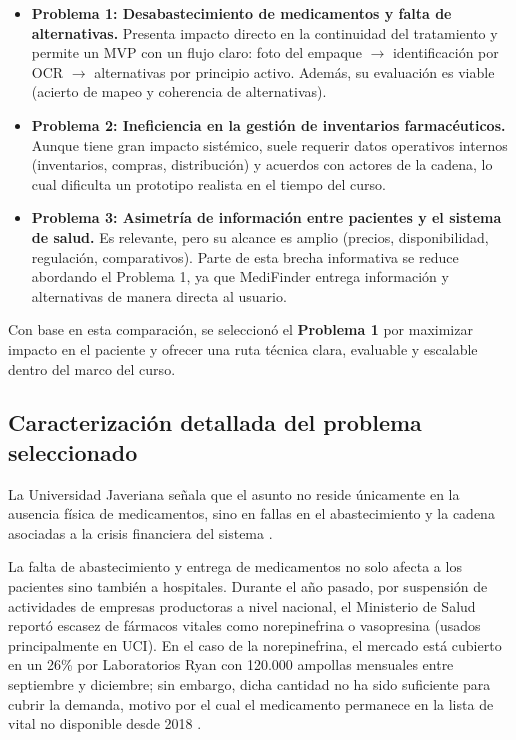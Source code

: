 \begin{itemize}
	\item \textbf{Problema 1: Desabastecimiento de medicamentos y falta de alternativas.} Presenta impacto directo en la continuidad del tratamiento y permite un MVP con un flujo claro: foto del empaque $\rightarrow$ identificación por OCR $\rightarrow$ alternativas por principio activo. Además, su evaluación es viable (acierto de mapeo y coherencia de alternativas).
	
	\item \textbf{Problema 2: Ineficiencia en la gestión de inventarios farmacéuticos.} Aunque tiene gran impacto sistémico, suele requerir datos operativos internos (inventarios, compras, distribución) y acuerdos con actores de la cadena, lo cual dificulta un prototipo realista en el tiempo del curso.
	
	\item \textbf{Problema 3: Asimetría de información entre pacientes y el sistema de salud.} Es relevante, pero su alcance es amplio (precios, disponibilidad, regulación, comparativos). Parte de esta brecha informativa se reduce abordando el Problema 1, ya que MediFinder entrega información y alternativas de manera directa al usuario.
\end{itemize}

Con base en esta comparación, se seleccionó el \textbf{Problema 1} por maximizar impacto en el paciente y ofrecer una ruta técnica clara, evaluable y escalable dentro del marco del curso.

\subsection{Caracterización detallada del problema seleccionado}

La Universidad Javeriana señala que el asunto no reside únicamente en la ausencia física de medicamentos, sino en fallas en el abastecimiento y la cadena asociadas a la crisis financiera del sistema \cite{diaz2025}.

La falta de abastecimiento y entrega de medicamentos no solo afecta a los pacientes sino también a hospitales. Durante el año pasado, por suspensión de actividades de empresas productoras a nivel nacional, el Ministerio de Salud reportó escasez de fármacos vitales como norepinefrina o vasopresina (usados principalmente en UCI). En el caso de la norepinefrina, el mercado está cubierto en un 26\% por Laboratorios Ryan con 120.000 ampollas mensuales entre septiembre y diciembre; sin embargo, dicha cantidad no ha sido suficiente para cubrir la demanda, motivo por el cual el medicamento permanece en la lista de vital no disponible desde 2018 \cite{saavedra2025}.

